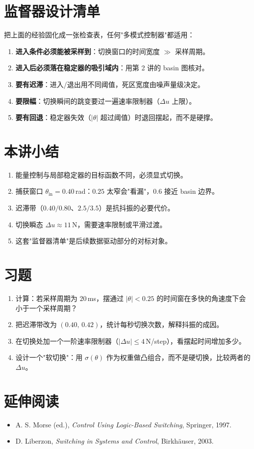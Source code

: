 \section{监督器设计清单}

把上面的经验固化成一张检查表，任何"多模式控制器"都适用：

\begin{enumerate}[leftmargin=2em,itemsep=3pt]
  \item \textbf{进入条件必须能被采样到}：切换窗口的时间宽度 $\gg$ 采样周期。
  \item \textbf{进入后必须落在稳定器的吸引域内}：用第 2 讲的 basin 图核对。
  \item \textbf{要有迟滞}：进入/退出用不同阈值，死区宽度由噪声量级决定。
  \item \textbf{要限幅}：切换瞬间的跳变要过一遍速率限制器（$\Delta u$ 上限）。
  \item \textbf{要有回退}：稳定器失效（$|\theta|$ 超过阈值）时退回摆起，而不是硬撑。
\end{enumerate}

\section{本讲小结}
\begin{enumerate}[leftmargin=2em,itemsep=2pt]
  \item 能量控制与局部稳定器的目标函数不同，必须显式切换。
  \item 捕获窗口 $\theta_{\mathrm{in}}=0.40$\,rad：$0.25$ 太窄会"看漏"，$0.6$ 接近 basin 边界。
  \item 迟滞带（$0.40/0.80$、$2.5/3.5$）是抗抖振的必要代价。
  \item 切换瞬态 $\Delta u\approx11$\,N，需要速率限制或平滑过渡。
  \item 这套"监督器清单"是后续数据驱动部分的对标对象。
\end{enumerate}

\section*{习题}
\begin{enumerate}[leftmargin=2em,itemsep=6pt]
  \item 计算：若采样周期为 $20$\,ms，摆通过 $|\theta|<0.25$ 的时间窗在多快的角速度下会小于一个采样周期？
  \item 把迟滞带改为 $(0.40,\,0.42)$，统计每秒切换次数，解释抖振的成因。
  \item 在切换处加一个一阶速率限制器（$|\Delta u|\le4$\,N/step），看摆起时间增加多少。
  \item 设计一个"软切换"：用 $\sigma(\theta)$ 作为权重做凸组合，而不是硬切换，比较两者的 $\Delta u$。
\end{enumerate}

\section*{延伸阅读}
\begin{itemize}[leftmargin=2em,itemsep=2pt]
  \item A. S. Morse (ed.), \emph{Control Using Logic-Based Switching}, Springer, 1997.
  \item D. Liberzon, \emph{Switching in Systems and Control}, Birkhäuser, 2003.
\end{itemize}
